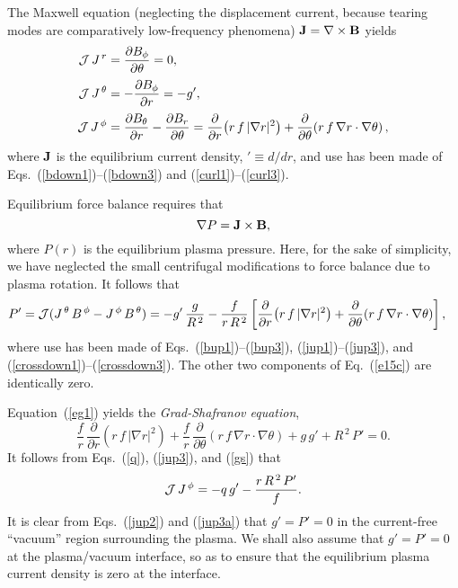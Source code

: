 \documentclass[12pt,prb,aps]{revtex4-1}
\begin{document}
The Maxwell equation (neglecting the displacement current, because tearing modes are comparatively low-frequency phenomena)
${\bf J}= \nabla\times{\bf B}$
yields
\begin{align}
{\cal J}\,J^{\,r} &= \frac{\partial B_\phi}{\partial \theta} =0,\label{jup1}\\[0.5ex]
{\cal J}\,J^{\,\theta} &= -\frac{\partial B_\phi}{\partial r} = - g',\label{jup2}\\[0.5ex]
{\cal J}\,J^{\,\phi}&= \frac{\partial B_\theta}{\partial r} -\frac{\partial B_r}{\partial\theta}=\frac{\partial}{\partial r}\!\left(r\,f\,|\nabla r|^2\right)+ \frac{\partial}{\partial\theta}\!\left(r\,f\,\nabla r\cdot\nabla\theta\right),\label{jup3}
\end{align}
where ${\bf J}$ is the equilibrium current density, $'\equiv d/dr$, and use has been made of  Eqs.~(\ref{bdown1})--(\ref{bdown3}) and (\ref{curl1})--(\ref{curl3}).

Equilibrium force balance requires that
\begin{equation}\label{e15c}
 \nabla P={\bf J}\times {\bf B},
\end{equation}
where $P(r)$ is the equilibrium plasma pressure. Here, for the sake of simplicity, we have neglected the small centrifugal modifications to force balance due to plasma
rotation.\cite{flow,flow1}
It follows that 
\begin{align}\label{eg1}
P'&= {\cal J}(J^{\,\theta}\,B^{\,\phi}-J^{\,\phi}\,B^{\,\theta})= -g'\,\frac{g}{R^{\,2}} - \frac{f}{r\,R^{\,2}}\left[\frac{\partial}{\partial r}\!\left(r\,f\,|\nabla r|^2\right)+ \frac{\partial}{\partial\theta}\!\left(r\,f\,\nabla r\cdot\nabla\theta\right)\right],
\end{align}
where use has been made of Eqs.~(\ref{bup1})--(\ref{bup3}),  (\ref{jup1})--(\ref{jup3}), and (\ref{crossdown1})--(\ref{crossdown3}). The
other two components of Eq.~(\ref{e15c}) are identically zero. 

Equation~(\ref{eg1}) yields the {\em Grad-Shafranov equation},\cite{gs1}
\begin{equation}\label{gs}
\frac{f}{r}\,\frac{\partial}{\partial r}\!\left(r\,f\,|\nabla r|^2\right) +\frac{f}{r}\,\frac{\partial}{\partial\theta}\!\left(r\,f\,\nabla r\cdot\nabla\theta\right)+g\,g' + R^{\,2}\,P'=0.
\end{equation}
It follows from Eqs.~(\ref{q}), (\ref{jup3}), and (\ref{gs}) that
\begin{equation}\label{jup3a}
{\cal J}\,J^{\,\phi} = -q\,g' - \frac{r\,R^{\,2}\,P'}{f}.
\end{equation}
It is clear from Eqs.~(\ref{jup2}) and (\ref{jup3a}) that $g'=P'=0$ in the  current-free ``vacuum'' region surrounding the plasma.
We shall also assume that $g'=P'=0$ at the plasma/vacuum interface, so as to ensure that the equilibrium plasma
current density is zero at the interface. 
\end{document}
